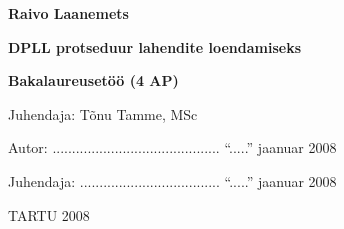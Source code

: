 \thispagestyle{empty}

\begin{center}
{\large{}}


{\textbf{\Large Raivo Laanemets}}

\vspace{4mm}

{\textbf{\LARGE DPLL protseduur lahendite loendamiseks}}

\vspace{5mm}

{\textbf{\Large Bakalaureusetöö (4 AP)}}

\end{center}


{\hfill{\Large Juhendaja: Tõnu Tamme, MSc}}


\begin{flushright}

\noindent Autor: ........................................... ``.....''
jaanuar\hskip16pt 2008

\vspace{2mm}

\noindent Juhendaja: .................................... ``.....''
jaanuar\hskip16pt 2008

\end{flushright}


\begin{center}
{\large{TARTU 2008}}
\end{center}


\newpage
